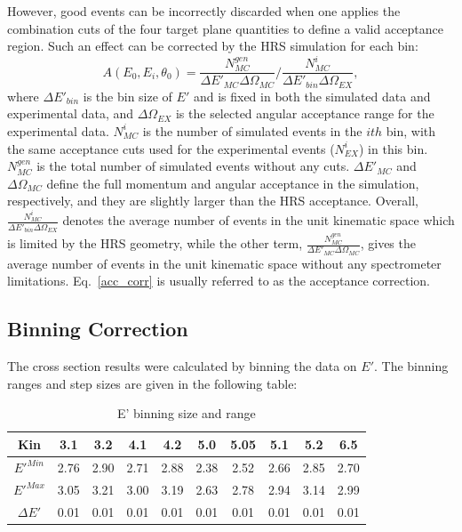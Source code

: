  However, good events can be incorrectly discarded when one applies the combination cuts of the four target plane quantities to define a valid acceptance region. Such an effect can be corrected by the HRS simulation for each bin:
 \begin{equation}
  A(E_{0},E_{i}, \theta_{0}) = \frac{N^{gen}_{MC}}{\Delta E'_{MC} \Delta\Omega_{MC}}/\frac{N^{i}_{MC}}{\Delta E'_{bin} \Delta\Omega_{EX}},
 \label{acc_corr}  
  \end{equation}
where $\Delta E'_{bin}$ is the bin size of $E'$ and is fixed in both the simulated data and experimental data, and $\Delta\Omega_{EX}$ is the selected angular acceptance range for the experimental data. $N^{i}_{MC}$ is the number of simulated events in the $ith$ bin, with the same acceptance cuts used for the experimental events ($N^{i}_{EX}$) in this bin.  $N^{gen}_{MC}$ is the total number of simulated events without any cuts. $\Delta E'_{MC}$ and $\Delta \Omega_{MC}$ define the full momentum and angular acceptance in the simulation, respectively, and they are slightly larger than the HRS acceptance. Overall,  $\frac{N^{i}_{MC}}{\Delta E'_{bin} \Delta\Omega_{EX}}$ denotes the average number of events in the unit kinematic space which is limited by the HRS geometry, while the other term, $\frac{N^{gen}_{MC}}{\Delta E'_{MC} \Delta\Omega_{MC}}$, gives the average number of events in the unit kinematic space without any spectrometer limitations. Eq.~\eqref{acc_corr} is usually referred to as the acceptance correction. 

\subsection{Binning Correction}
 The cross section results were calculated by binning the data on $E'$. The binning ranges and step sizes are given in the following table:
\begin{table}[!ht]
  \centering
  \begin{tabular}{|c||ccccccccc|}
    \hline
    \textbf{Kin}        & 3.1 & 3.2 & 4.1 & 4.2 &5.0 &5.05 & 5.1 & 5.2 & 6.5 \\
    \hline \hline
    $E'^{Min}$    & 2.76   & 2.90   & 2.71   & 2.88   &2.38   & 2.52   & 2.66   & 2.85   & 2.70   \\
    \hline
    $E'^{Max}$    & 3.05   & 3.21   & 3.00   & 3.19   &2.63   & 2.78   & 2.94   & 3.14   & 2.99   \\
    \hline
    $\Delta E'$      & 0.01   & 0.01   & 0.01   & 0.01   & 0.01  &0.01    & 0.01   & 0.01   & 0.01  \\
    \hline
  \end{tabular}
  \caption{E' binning size and range}
  \label{bin_table}	
\end{table}

